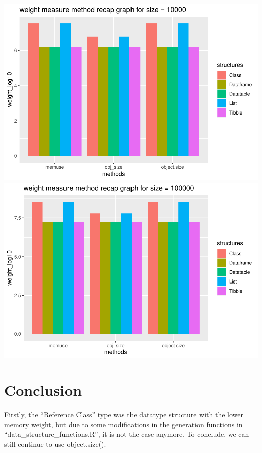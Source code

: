 \documentclass[
]{article}
\begin{document}
\includegraphics{comparative_methods_for_measuring_memory_weight_files/figure-latex/code-1.pdf}
\includegraphics{comparative_methods_for_measuring_memory_weight_files/figure-latex/code-2.pdf}

\hypertarget{conclusion}{%
\section{Conclusion}\label{conclusion}}

Firstly, the ``Reference Class'' type was the datatype structure with
the lower memory weight, but due to some modifications in the generation
functions in ``data\_structure\_functions.R'', it is not the case
anymore. To conclude, we can still continue to use object.size().
\end{document}

